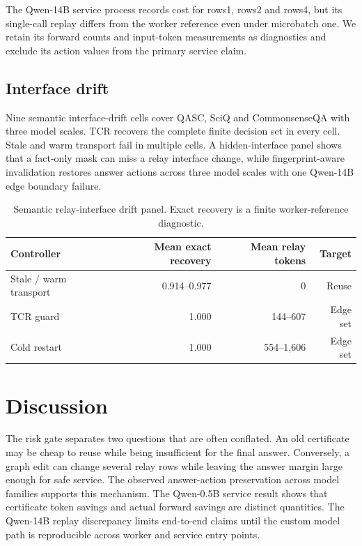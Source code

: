 \documentclass[11pt]{article}
\begin{document}
The Qwen-14B service process records cost for rows1, rows2 and rows4, but its single-call replay differs from the worker reference even under microbatch one. We retain its forward counts and input-token measurements as diagnostics and exclude its action values from the primary service claim.

\subsection{Interface drift}
Nine semantic interface-drift cells cover QASC, SciQ and CommonsenseQA with three model scales. TCR recovers the complete finite decision set in every cell. Stale and warm transport fail in multiple cells. A hidden-interface panel shows that a fact-only mask can miss a relay interface change, while fingerprint-aware invalidation restores answer actions across three model scales with one Qwen-14B edge boundary failure.

\begin{table}[t]
\centering\small
\begin{tabular}{lrrr}
\toprule
Controller & Mean exact recovery & Mean relay tokens & Target\\
\midrule
Stale / warm transport & 0.914--0.977 & 0 & Reuse\\
TCR guard & 1.000 & 144--607 & Edge set\\
Cold restart & 1.000 & 554--1,606 & Edge set\\
\bottomrule
\end{tabular}
\caption{Semantic relay-interface drift panel. Exact recovery is a finite worker-reference diagnostic.}
\end{table}

\section{Discussion}
The risk gate separates two questions that are often conflated. An old certificate may be cheap to reuse while being insufficient for the final answer. Conversely, a graph edit can change several relay rows while leaving the answer margin large enough for safe service. The observed answer-action preservation across model families supports this mechanism. The Qwen-0.5B service result shows that certificate token savings and actual forward savings are distinct quantities. The Qwen-14B replay discrepancy limits end-to-end claims until the custom model path is reproducible across worker and service entry points.
\end{document}
